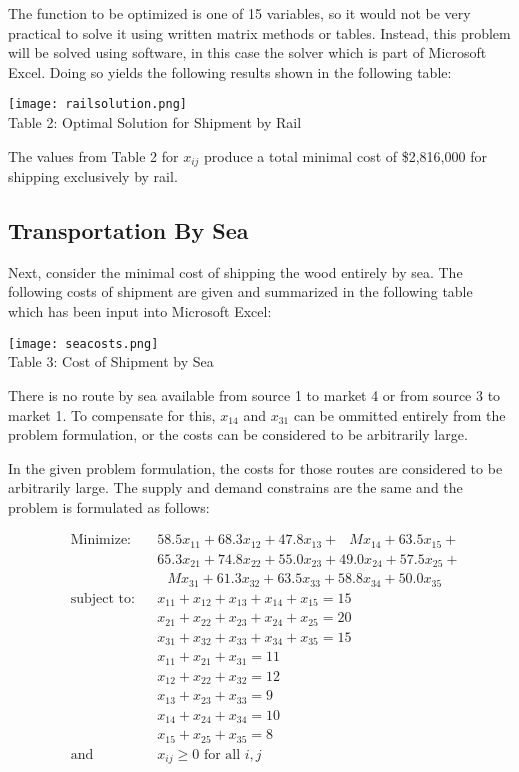 \documentclass[12pt,letterpaper]{article}
\begin{document}
The function to be optimized is one of 15 variables, so it would not be very practical to solve it using written matrix
methods or tables.  Instead, this problem will be solved using software, in this case the solver which is part of
Microsoft Excel.  Doing so yields the following results shown in the following table:

\begin{center}
\texttt{[image: railsolution.png]}\\
Table 2: Optimal Solution for Shipment by Rail
\end{center}

The values from Table 2 for $x_{ij}$ produce a total minimal cost of \$2,816,000 for shipping exclusively by rail.

\subsection{Transportation By Sea}
Next, consider the minimal cost of shipping the wood entirely by sea.  The following costs of shipment are given
and summarized in the following table which has been input into Microsoft Excel:

\begin{center}
\texttt{[image: seacosts.png]}\\
Table 3: Cost of Shipment by Sea
\end{center}

There is no route by sea available from source 1 to market 4 or from source 3 to market 1.  To compensate for this,
$x_{14}$ and $x_{31}$ can be ommitted entirely from the problem formulation, or the costs can be considered to be
arbitrarily large.

In the given problem formulation, the costs for those routes are considered to be arbitrarily large.  The supply and
demand constrains are the same and the problem is formulated as follows:

$$
\begin{aligned}
& \text{Minimize:}
& & 58.5x_{11} + 68.3x_{12} + 47.8x_{13} + \;\;\,Mx_{14} + 63.5x_{15} + \\
&&& 65.3x_{21} + 74.8x_{22} + 55.0x_{23} + 49.0x_{24} + 57.5x_{25} + \\
&&& \;\;\,Mx_{31} + 61.3x_{32} + 63.5x_{33} + 58.8x_{34} + 50.0x_{35} \\
& \text{subject to:}
& & x_{11} + x_{12} + x_{13} + x_{14} + x_{15} = 15 \\
&&& x_{21} + x_{22} + x_{23} + x_{24} + x_{25} = 20 \\
&&& x_{31} + x_{32} + x_{33} + x_{34} + x_{35} = 15 \\
&&& x_{11} + x_{21} + x_{31} = 11 \\
&&& x_{12} + x_{22} + x_{32} = 12 \\
&&& x_{13} + x_{23} + x_{33} = 9 \\
&&& x_{14} + x_{24} + x_{34} = 10 \\
&&& x_{15} + x_{25} + x_{35} = 8 \\
& \text{and}
& & x_{ij} \geq 0 \text{ for all } i, j \\
\end{aligned}
$$
\end{document}
